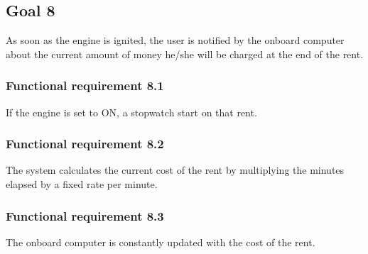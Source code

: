 \subsection{Goal 8}
As soon as the engine is ignited, the user is notified by the onboard computer about the current amount of money he/she will be charged at the end of the rent.
\setcounter{secnumdepth}{3}
\subsubsection{Functional requirement 8.1}
If the engine is set to ON, a stopwatch start on that rent.

\subsubsection{Functional requirement 8.2}
The system calculates the current cost of the rent by multiplying the minutes elapsed by a fixed rate per minute.

\subsubsection{Functional requirement 8.3}
The onboard computer is constantly updated with the cost of the rent.
